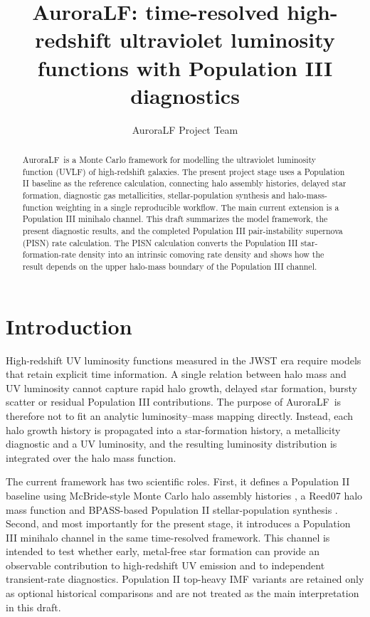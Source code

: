 \documentclass[twocolumn,times]{aastex701}
\newcommand{\AuroraLF}{AuroraLF}
\begin{document}
\title{\AuroraLF: time-resolved high-redshift ultraviolet luminosity functions with Population III diagnostics}

\author{AuroraLF Project Team}

\begin{abstract}
\AuroraLF\ is a Monte Carlo framework for modelling the ultraviolet luminosity function (UVLF) of high-redshift galaxies. The present project stage uses a Population II baseline as the reference calculation, connecting halo assembly histories, delayed star formation, diagnostic gas metallicities, stellar-population synthesis and halo-mass-function weighting in a single reproducible workflow. The main current extension is a Population III minihalo channel. This draft summarizes the model framework, the present diagnostic results, and the completed Population III pair-instability supernova (PISN) rate calculation. The PISN calculation converts the Population III star-formation-rate density into an intrinsic comoving rate density and shows how the result depends on the upper halo-mass boundary of the Population III channel.
\end{abstract}


\section{Introduction}\label{sec:introduction}

High-redshift UV luminosity functions measured in the JWST era require models that retain explicit time information. A single relation between halo mass and UV luminosity cannot capture rapid halo growth, delayed star formation, bursty scatter or residual Population III contributions. The purpose of \AuroraLF\ is therefore not to fit an analytic luminosity--mass mapping directly. Instead, each halo growth history is propagated into a star-formation history, a metallicity diagnostic and a UV luminosity, and the resulting luminosity distribution is integrated over the halo mass function.

The current framework has two scientific roles. First, it defines a Population II baseline using McBride-style Monte Carlo halo assembly histories \citep{McBride2009}, a Reed07 halo mass function \citep{Reed2007} and BPASS-based Population II stellar-population synthesis \citep{Eldridge2017,Stanway2018}. Second, and most importantly for the present stage, it introduces a Population III minihalo channel in the same time-resolved framework. This channel is intended to test whether early, metal-free star formation can provide an observable contribution to high-redshift UV emission and to independent transient-rate diagnostics. Population II top-heavy IMF variants are retained only as optional historical comparisons and are not treated as the main interpretation in this draft.
\end{document}
